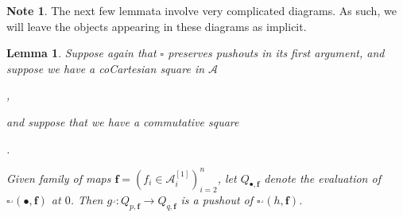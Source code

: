 \documentclass[a4paper]{article}
\numberwithin{equation}{subsection}
\theoremstyle{plain}   %
\newtheorem{lemma}[equation]{Lemma}
\theoremstyle{definition}
\newtheorem{note}[equation]{Note}
\theoremstyle{remark}
\theoremstyle{plain}
\DeclareMathOperator{\id}{id}
\begin{document}
\begin{note}
	The next few lemmata involve very complicated diagrams.  As such, we will leave the objects appearing in these diagrams as implicit.
\end{note}
\begin{lemma}\label{cornertwist}
	Suppose again that \(\square\) preserves pushouts in its first argument, and suppose we have a coCartesian square in \(\mathcal{A}\)
	\begin{center}
		,
	\end{center}
	and suppose that we have a commutative square
	\begin{center}
		.
	\end{center}
	Given family of maps \(\mathbf{f}=(f_i \in \mathcal{A}_i^{[1]})_{i=2}^n\), let \(Q_{\bullet,\mathbf{f}}\) denote the evaluation of \(\square^\lrcorner(\bullet,\mathbf{f})\) at \(0\). Then \(g^\lrcorner: Q_{p,\mathbf{f}} \to Q_{q,\mathbf{f}}\) is a pushout of \(\square^\lrcorner(h,\mathbf{f})\).  
\end{lemma}
\end{document}
